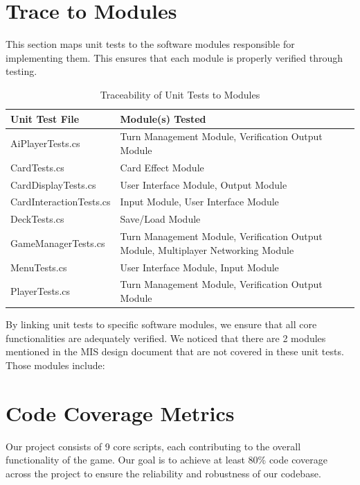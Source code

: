 \documentclass[12pt, titlepage]{article}
\begin{document}
\section{Trace to Modules}
This section maps unit tests to the software modules responsible for implementing them. This ensures that each module is properly verified through testing.

\begin{table}[H]
    \centering
    \begin{tabularx}{\textwidth}{|l|X|}
        \hline
        \textbf{Unit Test File} & \textbf{Module(s) Tested} \\
        \hline
        AiPlayerTests.cs & Turn Management Module, Verification Output Module \\
        \hline
        CardTests.cs & Card Effect Module \\
        \hline
        CardDisplayTests.cs & User Interface Module, Output Module \\
        \hline
        CardInteractionTests.cs & Input Module, User Interface Module \\
        \hline
        DeckTests.cs & Save/Load Module \\
        \hline
        GameManagerTests.cs & Turn Management Module, Verification Output Module, Multiplayer Networking Module \\
        \hline
        MenuTests.cs & User Interface Module, Input Module \\
        \hline
        PlayerTests.cs & Turn Management Module, Verification Output Module \\
        \hline
    \end{tabularx}
    \caption{Traceability of Unit Tests to Modules}
    \label{tab:trace_unit_tests}
\end{table}

By linking unit tests to specific software modules, we ensure that all core functionalities are adequately verified. We noticed that there are 2 modules mentioned in the MIS design document that are not covered in these unit tests. Those modules include:


\section{Code Coverage Metrics}
Our project consists of 9 core scripts, each contributing to the overall functionality of the game. Our goal is to achieve at least 80\% code coverage across the project to ensure the reliability and robustness of our codebase.
\end{document}
